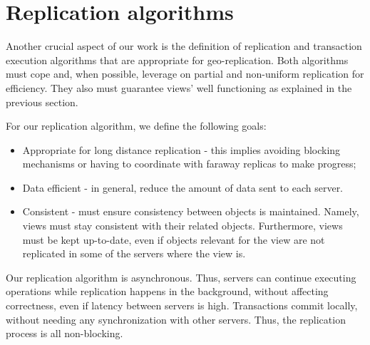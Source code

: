 \section{Replication algorithms}
\label{sec:replication_algorithm}

Another crucial aspect of our work is the definition of replication and transaction execution algorithms that are appropriate for geo-replication.
Both algorithms must cope and, when possible, leverage on partial and non-uniform replication for efficiency.
They also must guarantee views' well functioning as explained in the previous section.

For our replication algorithm, we define the following goals:
\begin{itemize}
	\item Appropriate for long distance replication - this implies avoiding blocking mechanisms or having to coordinate with faraway replicas to make progress;
	\item Data efficient - in general, reduce the amount of data sent to each server.
	\item Consistent - must ensure consistency between objects is maintained. Namely, views must stay consistent with their related objects.
	Furthermore, views must be kept up-to-date, even if objects relevant for the view are not replicated in some of the servers where the view is.
\end{itemize}

Our replication algorithm is asynchronous.
Thus, servers can continue executing operations while replication happens in the background, without affecting correctness, even if latency between servers is high.
Transactions commit locally, without needing any synchronization with other servers.
Thus, the replication process is all non-blocking.

